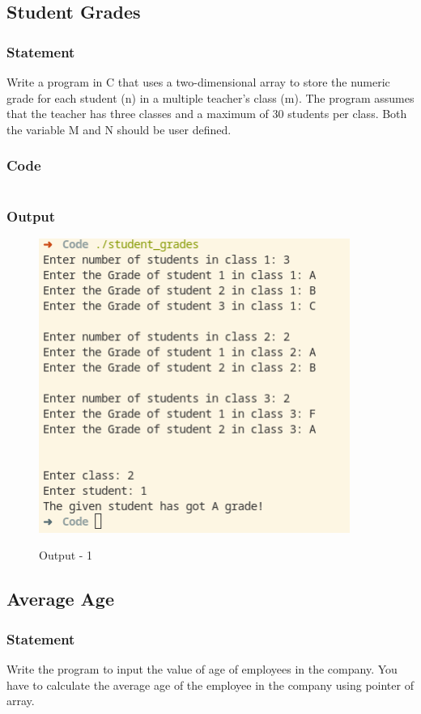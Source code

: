 \subsection{Student Grades}

\subsubsection{Statement}
Write a program in C that uses a two-dimensional array to store the numeric grade for
each student (n) in a multiple teacher’s class (m). The program assumes that the teacher has three
classes and a maximum of 30 students per class. Both the variable M and N should be user
defined.

\subsubsection{Code}
\inputminted[]{c}{../Code/student_grades.cpp}
\subsubsection{Output}
\begin{figure}[!htb]
  \centering
  \includegraphics[width=4in]{Images/1.png}
  \label{Output-1}
  \caption{Output - 1}
\end{figure}

\pagebreak
\subsection{Average Age}

\subsubsection{Statement}
Write the program to input the value of age of employees in the company. You have to
calculate the average age of the employee in the company using pointer of array.

